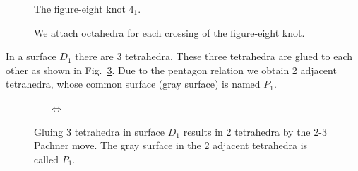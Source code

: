 \documentclass[12pt]{article}
\numberwithin{equation}{section}
\begin{document}
\begin{figure}[htbp]
  \begin{center}
    \caption{The figure-eight knot $4_1$.}
    \label{fig:fig_eight}
  \end{center}
\end{figure}

\begin{figure}[htbp]
  \begin{center}
    \begin{psfrags}
%
%
    \end{psfrags}
    \caption{We attach octahedra for each crossing of the figure-eight
      knot.}
    \label{fig:fig_eight_tetra}
  \end{center}
\end{figure}

In a surface $D_1$ there are 3 tetrahedra.
These three tetrahedra are glued to each other as shown in
Fig.~\ref{fig:41_glue_1}.
Due to the pentagon
relation we obtain  2 adjacent tetrahedra, whose common surface
(gray surface)  is named  $P_1$.

\begin{figure}[htbp]
  \begin{center}
    \parbox{8cm}{
      \begin{psfrags}
      \end{psfrags}
      }
    ~~~$\Longleftrightarrow$~~~
    \parbox{5cm}{
      \begin{psfrags}
      \end{psfrags}
      }
    \caption{Gluing  3 tetrahedra in surface $D_1$ results in 2
      tetrahedra by the 2-3 Pachner move.
      The gray surface in the 2 adjacent tetrahedra is called $P_1$.
      }
    \label{fig:41_glue_1}
  \end{center}
\end{figure}
\end{document}
